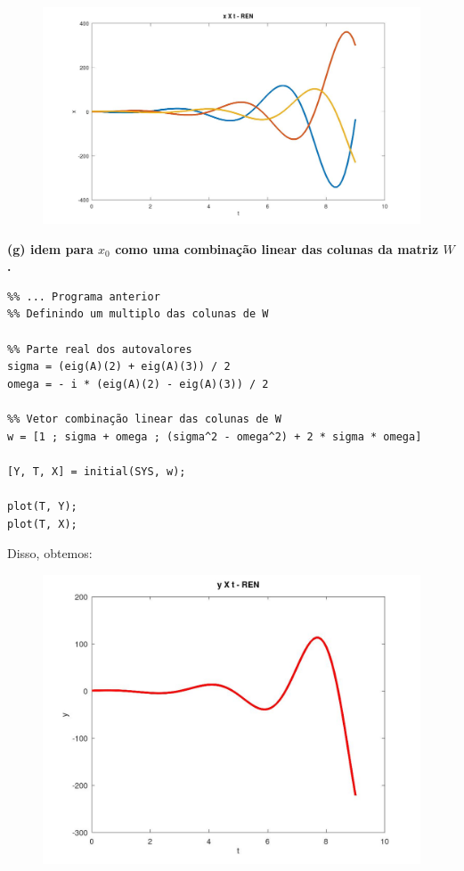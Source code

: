 \documentclass[11pt]{article}
\begin{document}
\begin{figure}[h]
  \includegraphics[scale=0.23]{plot1f2.jpg}
  \centering
\end{figure}

\textbf{(g) idem para $x_0$ como uma combinação linear das colunas da matriz $W$.}

\begin{verbatim}
%% ... Programa anterior
%% Definindo um multiplo das colunas de W

%% Parte real dos autovalores
sigma = (eig(A)(2) + eig(A)(3)) / 2
omega = - i * (eig(A)(2) - eig(A)(3)) / 2

%% Vetor combinação linear das colunas de W
w = [1 ; sigma + omega ; (sigma^2 - omega^2) + 2 * sigma * omega]

[Y, T, X] = initial(SYS, w);

plot(T, Y);
plot(T, X);
\end{verbatim}

Disso, obtemos:
\begin{figure}[h]
  \includegraphics[scale=0.28]{plot1g1.jpg}
  \centering
\end{figure}
\end{document}
